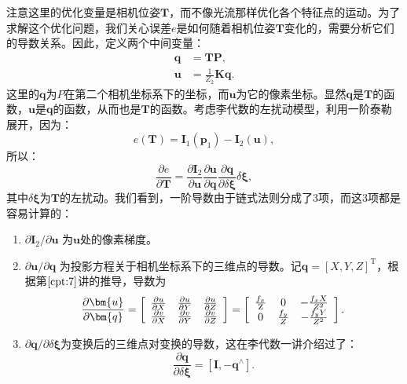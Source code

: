 注意这里的优化变量是相机位姿$\bm{T}$，而不像光流那样优化各个特征点的运动。为了求解这个优化问题，我们关心误差$e$是如何随着相机位姿$\bm{T}$变化的，需要分析它们的导数关系。因此，定义两个中间变量：
\begin{align*}
\bm{q} &= \bm{T} \bm{P}, \\
\bm{u} &= \frac{1}{{{Z_2}}} \bm{K} \bm{q}.
\end{align*}
这里的$\bm{q}$为$P$在第二个相机坐标系下的坐标，而$\bm{u}$为它的像素坐标。显然$\bm{q}$是$\bm{T}$的函数，$\bm{u}$是$\bm{q}$的函数，从而也是$\bm{T}$的函数。考虑李代数的左扰动模型，利用一阶泰勒展开，因为：
\begin{equation}
e(\bm{T})=\bm{I}_1(\bm{p}_{1})-\bm{I}_2(\bm{u}),
\end{equation}
所以：
\begin{equation}
\frac{\partial e}{\partial \bm{T}} = \frac{{\partial {\bm{I}_2}}}{{\partial \bm{u}}}\frac{{\partial \bm{u}}}{{\partial \bm{q}}}\frac{{\partial \bm{q}}}{{\partial \delta \bm{\xi} }}\delta \bm{\xi},
\end{equation}
其中$\delta \bm{\xi}$为$\bm{T}$的左扰动。我们看到，一阶导数由于链式法则分成了3项，而这3项都是容易计算的：

\begin{enumerate}
	\item $ \partial \bm{I}_2 / \partial \bm{u} $ 为$\bm{u}$处的像素梯度。
	\item $ \partial \bm{u} / \partial \bm{q} $ 为投影方程关于相机坐标系下的三维点的导数。记$\bm{q}=[X,Y,Z]^\mathrm{T}$，根据第$\ref{cpt:7}$讲的推导，导数为
	\begin{equation}
	\frac{{\partial \bm{u}}}{{\partial \bm{q}}} = \left[ {\begin{array}{*{20}{c}}
		{\frac{{\partial u}}{{\partial X}}}&{\frac{{\partial u}}{{\partial Y}}}&{\frac{{\partial u}}{{\partial Z}}}\\
		{\frac{{\partial v}}{{\partial X}}}&{\frac{{\partial v}}{{\partial Y}}}&{\frac{{\partial v}}{{\partial Z}}}
		\end{array}} \right] = \left[ {\begin{array}{*{20}{c}}
		{\frac{{{f_x}}}{{\rm{Z}}}}&0&{ - \frac{{{f_x}X}}{{{Z^2}}}}\\
		0&{\frac{{{f_y}}}{Z}}&{ - \frac{{{f_y}Y}}{{{Z^2}}}}
		\end{array}} \right].
	\end{equation}
	
	\item ${\partial \bm{q}}/{\partial \delta \bm{\xi} }$为变换后的三维点对变换的导数，这在李代数一讲介绍过了：
	\begin{equation}
	\frac{{\partial \bm{q}}}{{\partial \delta \bm{\xi} }} = \left[ { \bm{I}, - {\bm{q}^ \wedge }} \right].
	\end{equation}
\end{enumerate}


